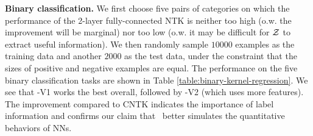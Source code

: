 {\bf Binary classification.} We first choose five pairs of categories on which the performance of the 2-layer fully-connected NTK is neither too high (o.w. the improvement will be marginal) nor too low (o.w. it may be difficult for ${\mathcal{Z}}$ to extract useful information). 
We then randomly sample $10000$ examples as the training data and another $2000$ as the test data, under the constraint that the sizes of positive and negative examples are equal.
The performance on the five binary classification tasks are shown in Table \ref{table:binary-kernel-regression}. 
We see that \lantkFJLT-V1 works the best overall, followed by \lantkFJLT-V2 (which uses more features).
The improvement compared to CNTK indicates the importance of label information and confirms our claim that \lantk~better simulates the quantitative behaviors of NNs.



\begin{table}[t]
\centering
{}
\caption{Performance of \lantk~, CNTK, and CNN on multi-class image classification tasks on CIFAR-10. The improvement is  more evident than the binary classification.
}
\label{table:multiple-kernel-regression}
\end{table}

